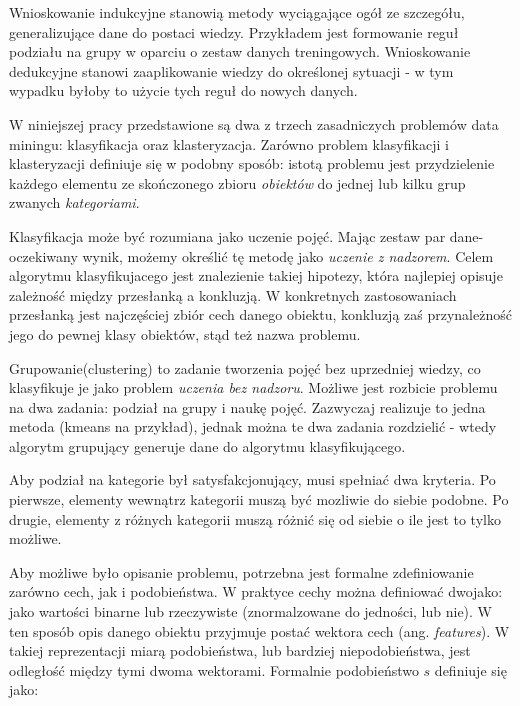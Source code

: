 \documentclass[12pt,a4paper,oneside]{report} %
\begin{document}
Wnioskowanie indukcyjne stanowią metody wyciągające ogół ze szczegółu, generalizujące dane do postaci wiedzy. Przykładem jest formowanie reguł podziału na grupy w oparciu o zestaw danych treningowych. Wnioskowanie dedukcyjne stanowi zaaplikowanie wiedzy do określonej sytuacji - w tym wypadku byłoby to użycie tych reguł do nowych danych. \par

W niniejszej pracy przedstawione są dwa z trzech zasadniczych problemów data miningu: klasyfikacja oraz klasteryzacja. Zarówno problem klasyfikacji i klasteryzacji definiuje się w podobny sposób: istotą problemu jest przydzielenie każdego elementu ze skończonego zbioru \emph{obiektów} do jednej lub kilku grup zwanych \emph{kategoriami}. \par

Klasyfikacja może być rozumiana jako uczenie pojęć. Mając zestaw par dane-oczekiwany wynik, możemy określić tę metodę jako \emph{uczenie z nadzorem}. Celem algorytmu klasyfikujacego jest znalezienie takiej hipotezy, która najlepiej opisuje zależność między przesłanką a konkluzją. W konkretnych zastosowaniach przesłanką jest najczęściej zbiór cech danego obiektu, konkluzją zaś przynależność jego do pewnej klasy obiektów, stąd też nazwa problemu. \par

Grupowanie(clustering) to zadanie tworzenia pojęć bez uprzedniej wiedzy, co klasyfikuje je jako problem \emph{uczenia bez nadzoru}. Możliwe jest rozbicie problemu na dwa zadania: podział na grupy i naukę pojęć. Zazwyczaj realizuje to jedna metoda (kmeans na przykład), jednak można te dwa zadania rozdzielić - wtedy algorytm grupujący generuje dane do algorytmu klasyfikującego.\par

Aby podział na kategorie był satysfakcjonujący, musi spełniać dwa kryteria. Po pierwsze, elementy wewnątrz kategorii muszą być mozliwie do siebie podobne. Po drugie, elementy z różnych kategorii muszą różnić się od siebie o ile jest to tylko możliwe.\par

Aby możliwe było opisanie problemu, potrzebna jest formalne zdefiniowanie zarówno cech, jak i podobieństwa. W praktyce cechy można definiować dwojako: jako wartości binarne lub rzeczywiste (znormalzowane do jedności, lub nie). W ten sposób opis danego obiektu przyjmuje postać wektora cech (ang. \emph{features}). W takiej reprezentacji miarą podobieństwa, lub bardziej niepodobieństwa, jest odległość między tymi dwoma wektorami. Formalnie podobieństwo $s$ definiuje się jako:\par
\end{document}
